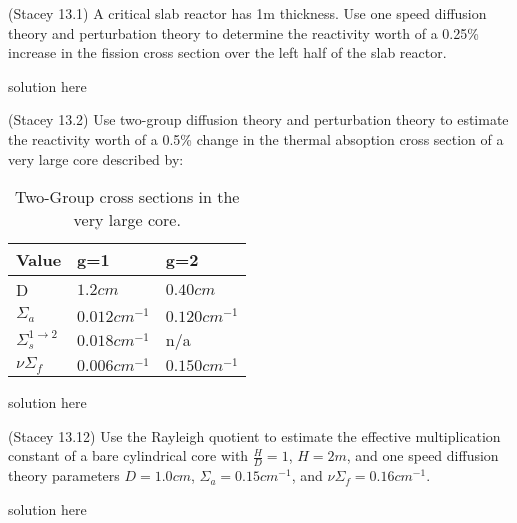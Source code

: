 \documentclass[11pt,answers]{exam}
\begin{document}
\begin{questions}

        \question[30] 
        (Stacey 13.1)
        A critical slab reactor has 1m thickness. 
        Use one speed diffusion theory and perturbation theory to 
        determine the reactivity worth of a 0.25\% increase in the fission 
        cross section over the left half of the slab reactor.
        \begin{solution}
                solution here
        \end{solution}

        
        \question[40] 
        (Stacey 13.2)
        Use two-group diffusion theory and perturbation theory to estimate the 
        reactivity worth of a 0.5\% change in the thermal absoption  cross 
        section of a very large core described by:
        
        \begin{table}[h!]
                \centering
                \begin{tabular}{lll}
                        \hline
                        \textbf{Value} & \textbf{g=1} & \textbf{g=2}\\
                        \hline
                        D & $1.2cm$ &  $0.40cm$\\
                        $\Sigma_a$ & $0.012cm^{-1}$ & $0.120cm^{-1}$ \\
                        $\Sigma_s^{1\rightarrow 2}$& $0.018cm^{-1}$ &  n/a \\
                        $\nu\Sigma_f$ & $0.006cm^{-1}$ & $0.150cm^{-1}$\\
                        \hline
                \end{tabular}
                \caption{Two-Group cross sections in the very large core.}
                \label{tab:prob2}
        \end{table}

        \begin{solution}
                solution here
        \end{solution}


        \question[30]
        (Stacey 13.12)
        Use the Rayleigh quotient to estimate the effective 
        multiplication constant of a bare cylindrical core with $\frac{H}{D} 
        =1$, $H=2m$, and one speed diffusion theory parameters $D=1.0cm$, 
        $\Sigma_a=0.15cm^{-1}$, and $\nu\Sigma_f=0.16cm^{-1}$. 
        \begin{solution}
                solution here
        \end{solution}


\end{questions}



%
%
\end{document}
